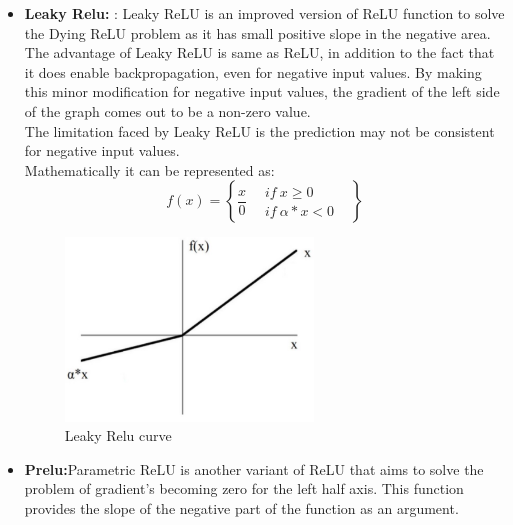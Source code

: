 \begin{enumerate}
\begin{itemize}
$$\begin{matrix}
                if \ x\geq 0 & \\ if \ x < 0
                & 
               \end{matrix} \right\}$$
               The major limitation of ReLU is Dying ReLU problem. The negative side of the graph makes the gradient value zero. Due to this reason, during the backpropagation process, the weights and biases for some neurons are not updated. This can create dead neuron which never get activated.
            \item {\bf Leaky Relu:} : Leaky ReLU is an improved version of ReLU function to solve the Dying ReLU  problem as it has small positive slope in the negative area. The advantage of Leaky ReLU is same as ReLU, in addition to the fact that it does enable backpropagation, even for negative input values. By making this minor modification for negative input values, the gradient of the left side of the graph comes out to be a non-zero value.\\
            The limitation faced by Leaky ReLU is the prediction may not be consistent for negative input values.\\
            Mathematically it can be represented as:
            $$f(x) =\left \{\frac{x}{0} \ \ \ \ \begin{matrix}
                if \ x\geq 0 & \\ if \ \alpha * x < 0
                & 
               \end{matrix} \right\}$$
            \begin{figure}[ht]
                \centering
                \includegraphics[width=2.6in]{./figures/leakyrelucurve.png}
                \caption{Leaky Relu curve}
            \end{figure}
            \item {\bf Prelu:}Parametric ReLU is another variant of ReLU that aims to solve the problem of gradient’s becoming zero for the left half axis. This function provides the slope of the negative part of the function as an argument. 
            \begin{figure}[ht]

\end{figure}
\end{itemize}
\end{enumerate}

